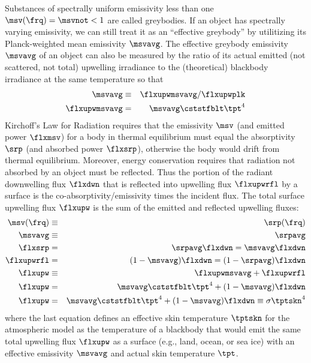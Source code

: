 \documentclass[12pt]{article}
\begin{document}
Substances of spectrally uniform emissivity less than one $\msv(\frq) = \msvnot  < 1$ are called greybodies.
If an object has spectrally varying emissivity, we can still treat it as an ``effective greybody'' by utilitizing its Planck-weighted mean emissivity $\msvavg$. 
The effective greybody emissivity $\msvavg$ of an object can also be measured by the ratio of its actual emitted (not scattered, not total) upwelling irradiance to the (theoretical) blackbody irradiance at the same temperature so that
\begin{eqnarray}
\msvavg & \equiv & \flxupwmsvavg/\flxupwplk \nonumber \\
\flxupwmsvavg & = & \msvavg \cststfblt \tpt^{4}
\label{eqn:msv_not_dfn}
\end{eqnarray}
Kirchoff's Law for Radiation requires that the emissivity $\msv$ (and emitted power $\flxmsv$) for a body in thermal equilibrium must equal the absorptivity $\srp$ (and absorbed power $\flxsrp$), otherwise the body would drift from thermal equilibrium. 
Moreover, energy conservation requires that radiation not absorbed by an object must be reflected.
Thus the portion of the radiant downwelling flux $\flxdwn$ that is reflected into upwelling flux $\flxupwrfl$ by a surface is the co-absorptivity/emissivity times the incident flux. 
The total surface upwelling flux $\flxupw$ is the sum of the emitted and reflected upwelling fluxes:
\begin{eqnarray}
\msv(\frq) & \equiv & \srp(\frq) \nonumber \\
\msvavg & \equiv & \srpavg \nonumber \\
\flxsrp & = & \srpavg \flxdwn = \msvavg \flxdwn \nonumber \\
\flxupwrfl & = & (1- \msvavg) \flxdwn = (1 - \srpavg) \flxdwn \nonumber \\
\flxupw & \equiv & \flxupwmsvavg + \flxupwrfl \nonumber \\
\flxupw & = & \msvavg \cststfblt \tpt^{4} +  (1- \msvavg) \flxdwn \nonumber \\
\flxupw & = & \msvavg \cststfblt \tpt^{4} +  (1- \msvavg) \flxdwn \equiv \sigma \tptskn^{4}
\label{eqn:flx_upw_dfn}
\end{eqnarray}
where the last equation defines an effective skin temperature $\tptskn$ for the atmospheric model as the temperature of a blackbody that would emit the same total upwelling flux $\flxupw$ as a surface (e.g., land, ocean, or sea ice) with an effective emissivity $\msvavg$ and actual skin temperature $\tpt$. 
\end{document}
